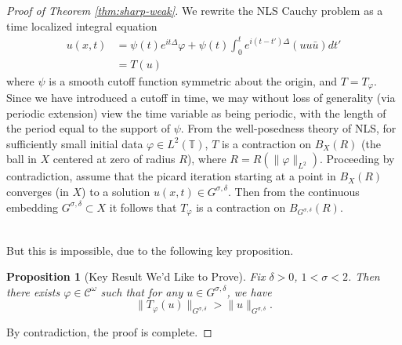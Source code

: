\documentclass[12pt,reqno]{amsart}
\numberwithin{equation}{section}  %
\newcommand{\ci}{\mathbb{T}}
\newcommand{\vp}{\varphi}
\newtheorem{proposition}[theorem]{Proposition}
\begin{document}
\begin{proof}[Proof of Theorem \ref{thm:sharp-weak}]
%
%
We rewrite the NLS Cauchy problem as a time localized integral equation   
  \begin{equation*}
  \begin{split}
    u(x,t)
    & = \psi(t) e^{it \Delta} \vp + \psi(t)
    \int_{0}^{t} e^{i(t - t') \Delta}(u u \bar{u})
    dt'
    \\
    & = T(u)
  \end{split}
  \end{equation*}
  where $\psi$ is a smooth
  cutoff function symmetric about the origin, and $T = T_{\vp}$. Since we have
  introduced a cutoff in time, we may without loss of generality
  (via periodic extension) view the time
  variable as being periodic, with the length of the period equal to the support
  of $\psi$. From the well-posedness theory of NLS, for sufficiently small initial
  data $\vp \in L^{2}(\ci)$, $T$ is a contraction on
  $B_{X}(R)$ (the ball in $X$ centered at zero of radius $R$), where $R =
  R(\|\vp \|_{L^{2}})$. Proceeding by contradiction, assume that the picard
  iteration starting at a point in $B_{X}(R)$ converges (in $X$)
  to a solution $u(x,t) \in G^{\sigma, \delta}$.
  Then from the continuous embedding $G^{\sigma, \delta} \subset X$ it follows
  that $T_{\vp}$ is a contraction on $B_{G^{\sigma, \delta}}(R)$. 
  \\
  \\
  \begin{center}
\end{center}
  But this is
  impossible, due to the following key proposition.
  \begin{proposition}[Key Result We'd Like to Prove]
    Fix $\delta > 0$, $1 < \sigma < 2$. Then there exists
    $\vp \in \mathcal{C}^{\omega}$ such that for
    any $u \in G^{\sigma, \delta}$, we have
  \begin{equation}
    \| T_{\vp}(u) \|_{G^{\sigma, \delta}} > \|u \|_{G^{\sigma, \delta}}.
  \end{equation}
  \label{prop:non-cont}
  \end{proposition}
By contradiction, the proof is complete. 
\end{proof}




        
\end{document}
